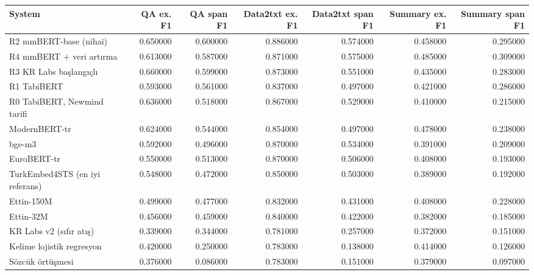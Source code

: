 \begin{tabular}{lrrrrrr}
\toprule
System & QA ex. F1 & QA span F1 & Data2txt ex. F1 & Data2txt span F1 & Summary ex. F1 & Summary span F1 \\
\midrule
R2 mmBERT-base (nihai) & 0.650000 & 0.600000 & 0.886000 & 0.574000 & 0.458000 & 0.295000 \\
R4 mmBERT + veri artırma & 0.613000 & 0.587000 & 0.871000 & 0.575000 & 0.485000 & 0.309000 \\
R3 KR Labs başlangıçlı & 0.660000 & 0.599000 & 0.873000 & 0.551000 & 0.435000 & 0.283000 \\
R1 TabiBERT & 0.593000 & 0.561000 & 0.837000 & 0.497000 & 0.421000 & 0.286000 \\
R0 TabiBERT, Newmind tarifi & 0.636000 & 0.518000 & 0.867000 & 0.529000 & 0.410000 & 0.215000 \\
ModernBERT-tr & 0.624000 & 0.544000 & 0.854000 & 0.497000 & 0.478000 & 0.238000 \\
bge-m3 & 0.592000 & 0.496000 & 0.870000 & 0.534000 & 0.391000 & 0.209000 \\
EuroBERT-tr & 0.550000 & 0.513000 & 0.870000 & 0.506000 & 0.408000 & 0.193000 \\
TurkEmbed4STS (en iyi referans) & 0.548000 & 0.472000 & 0.850000 & 0.503000 & 0.389000 & 0.192000 \\
Ettin-150M & 0.499000 & 0.477000 & 0.832000 & 0.431000 & 0.408000 & 0.228000 \\
Ettin-32M & 0.456000 & 0.459000 & 0.840000 & 0.422000 & 0.382000 & 0.185000 \\
KR Labs v2 (sıfır atış) & 0.339000 & 0.344000 & 0.781000 & 0.257000 & 0.372000 & 0.151000 \\
Kelime lojistik regresyon & 0.420000 & 0.250000 & 0.783000 & 0.138000 & 0.414000 & 0.126000 \\
Sözcük örtüşmesi & 0.376000 & 0.086000 & 0.783000 & 0.151000 & 0.379000 & 0.097000 \\
\bottomrule
\end{tabular}
